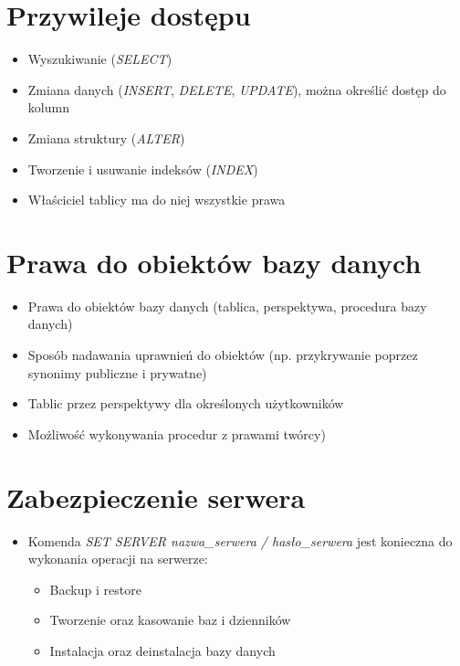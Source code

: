 \documentclass[a4paper,twoside]{article}
\begin{document}
  \section*{Przywileje dostępu}
      \begin{itemize}
          \item Wyszukiwanie (\emph{SELECT}) 
          \item Zmiana danych (\emph{INSERT}, \emph{DELETE}, \emph{UPDATE}), można określić dostęp do kolumn 
          \item Zmiana struktury (\emph{ALTER}) 
          \item Tworzenie i usuwanie indeksów (\emph{INDEX})
          \item Właściciel tablicy ma do niej wszystkie prawa
      \end{itemize}

  \section*{Prawa do obiektów bazy danych}
      \begin{itemize}
      \item Prawa do obiektów bazy danych (tablica, perspektywa, procedura bazy danych)
      \item Sposób nadawania uprawnień do obiektów (np. przykrywanie poprzez synonimy publiczne i prywatne)
      \item Tablic przez perspektywy dla określonych użytkowników
      \item Możliwość wykonywania procedur z prawami twórcy)
      \end{itemize}

  \section*{Zabezpieczenie serwera}
      \begin{itemize}
      \item Komenda \emph{SET SERVER nazwa\_serwera / hasło\_serwera} jest konieczna do wykonania operacji na serwerze:
          \begin{itemize}
          \item Backup i restore 
          \item Tworzenie oraz kasowanie baz i dzienników 
          \item Instalacja oraz deinstalacja bazy danych
          \end{itemize}
      \end{itemize}
\end{document}
